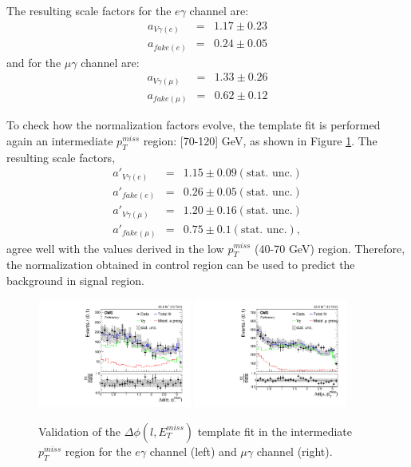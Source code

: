 \documentclass[thesis.tex]{subfiles}
\renewcommand\_{\textunderscore\allowbreak}
\begin{document}
The resulting scale factors for the $e\gamma$ channel are:
\begin{eqnarray*}
	a_{V\gamma(e)} &=& 1.17 \pm 0.23 \\
	a_{fake(e)}  &=& 0.24 \pm 0.05
\end{eqnarray*}
and for the $\mu\gamma$ channel are:
\begin{eqnarray*}
	a_{V\gamma(\mu)} &=& 1.33 \pm 0.26 \\
	a_{fake(\mu)}  &=& 0.62 \pm 0.12
\end{eqnarray*}

To check how the normalization factors evolve, the template fit is performed again an intermediate $p_T^{miss}$ region: [70-120] GeV, as shown in Figure \ref{fig:checkdPhi}. 
The resulting scale factors, 
\begin{eqnarray*}
	a'_{V\gamma(e)} &=& 1.15 \pm 0.09 (\text{stat. unc.}) \\
	a'_{fake(e)}  &=& 0.26 \pm 0.05 (\text{stat. unc.}) \\
	a'_{V\gamma(\mu)} &=& 1.20 \pm 0.16 (\text{stat. unc.}) \\
	a'_{fake(\mu)}  &=& 0.75 \pm 0.1 (\text{stat. unc.}),
\end{eqnarray*}
agree well with the values derived in the low $p_T^{miss}$ (40-70 GeV) region. 
Therefore, the normalization obtained in control region can be used to predict the background in signal region.

\begin{figure}[hbtp]
  \centering
    \includegraphics[width=0.45\textwidth]{Fig/fit_dPhi_eg_MET120.pdf}
    \includegraphics[width=0.45\textwidth]{Fig/fit_dPhi_mg_MET120.pdf}
  \caption{Validation of the $\Delta\phi(l,E_{T}^{miss})$ template fit in the intermediate $p_T^{miss}$ region for the $e\gamma$ channel (left) and $\mu\gamma$ channel (right).}
    \label{fig:checkdPhi}
\end{figure}
\end{document}
